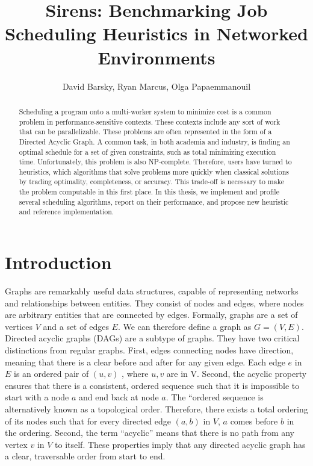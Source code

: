 \documentclass[11pt, oneside]{article}   	%
\title{Sirens: Benchmarking Job Scheduling Heuristics in Networked Environments}
\author{David Barsky, Ryan Marcus, Olga Papaemmanouil}
\date{}
\begin{document}
\maketitle

\begin{abstract}

Scheduling a program onto a multi-worker system to minimize cost is a common problem in performance-sensitive contexts. These contexts include any sort of work that can be parallelizable. These problems are often represented in the form of a Directed Acyclic Graph. A common task, in both academia and industry, is finding an optimal schedule for a set of given constraints, such as total minimizing execution time. Unfortunately, this problem is also NP-complete. Therefore, users have turned to heuristics, which algorithms that solve problems more quickly when classical solutions by trading optimality, completeness, or accuracy. This trade-off is necessary to make the problem computable in this first place. In this thesis, we implement and profile several scheduling algorithms, report on their performance, and propose new heuristic and reference implementation.

\end{abstract}

\section{Introduction}

Graphs are remarkably useful data structures, capable of representing networks and relationships between entities. They consist of nodes and edges, where nodes are arbitrary entities that are connected by edges. Formally, graphs are a set of vertices $V$ and a set of edges $E$. We can therefore define a graph as $G = (V, E)$. Directed acyclic graphs (DAGs) are a subtype of graphs. They have two critical distinctions from regular graphs. First, edges connecting nodes have direction, meaning that there is a clear before and after for any given edge. Each edge $e$ in $E$ is an ordered pair of $(u, v)$ , where $u, v$ are in V. Second, the acyclic property ensures that there is a consistent, ordered sequence such that it is impossible to start with a node $a$ and end back at node $a$. The ``ordered sequence is alternatively known as a topological order. Therefore, there exists a total ordering of its nodes such that for every directed edge $(a, b)$ in $V$, $a$ comes before $b$ in the ordering. Second, the term ``acyclic'' means that there is no path from any vertex $v$ in $V$ to itself. These properties imply that any directed acyclic graph has a clear, traversable order from start to end.
\end{document}
